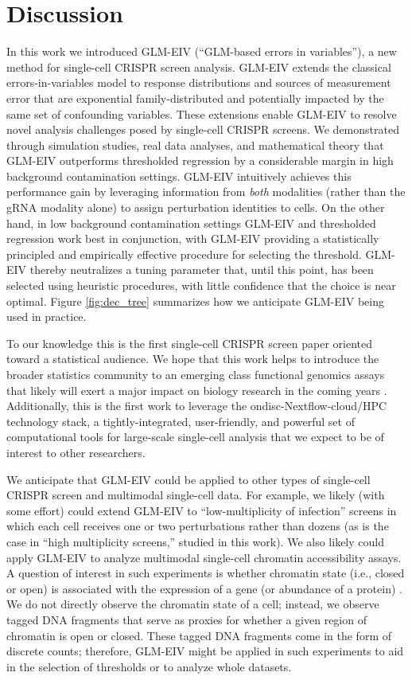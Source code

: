 \documentclass[12pt]{article}
\begin{document}
\section{Discussion}

In this work we introduced GLM-EIV (``GLM-based errors in variables''), a new method for single-cell CRISPR screen analysis. GLM-EIV extends the classical errors-in-variables model to response distributions and sources of measurement error that are exponential family-distributed and potentially impacted by the same set of confounding variables. These extensions enable GLM-EIV to resolve novel analysis challenges posed by single-cell CRISPR screens. We demonstrated through simulation studies, real data analyses, and mathematical theory that GLM-EIV outperforms thresholded regression by a considerable margin in high background contamination settings. GLM-EIV intuitively achieves this performance gain by leveraging information from \textit{both} modalities (rather than the gRNA modality alone) to assign perturbation identities to cells. On the other hand, in low background contamination settings GLM-EIV and thresholded regression work best in conjunction, with GLM-EIV providing a statistically principled and empirically effective procedure for selecting the threshold. GLM-EIV thereby neutralizes a tuning parameter that, until this point, has been selected using heuristic procedures, with little confidence that the choice is near optimal. Figure \ref{fig:dec_tree} summarizes how we anticipate GLM-EIV being used in practice.

To our knowledge this is the first single-cell CRISPR screen paper oriented toward a statistical audience. We hope that this work helps to introduce the broader statistics community to an emerging class functional genomics assays that likely will exert a major impact on biology research in the coming years \cite{Przybyla2021}. Additionally, this is the first work to leverage the ondisc-Nextflow-cloud/HPC technology stack, a tightly-integrated, user-friendly, and powerful set of computational tools for large-scale single-cell analysis that we expect to be of interest to other researchers.

We anticipate that GLM-EIV could be applied to other types of single-cell CRISPR screen and multimodal single-cell data. For example, we likely (with some effort) could extend GLM-EIV to ``low-multiplicity of infection'' screens \cite{Schraivogel2020} in which each cell receives one or two perturbations rather than dozens (as is the case in ``high multiplicity screens,'' studied in this work). We also likely could apply GLM-EIV to analyze multimodal single-cell chromatin accessibility assays. A question of interest in such experiments is whether chromatin state (i.e., closed or open) is associated with the expression of a gene (or abundance of a protein) \cite{Mimitou2021}. We do not directly observe the chromatin state of a cell; instead, we observe tagged DNA fragments that serve as proxies for whether a given region of chromatin is open or closed. These tagged DNA fragments come in the form of discrete counts; therefore, GLM-EIV might be applied in such experiments to aid in the selection of thresholds or to analyze whole datasets. 
\end{document}
